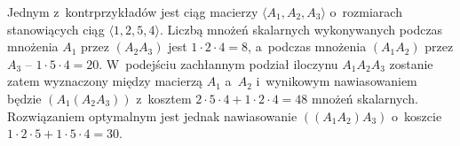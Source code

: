 \exercise %
Jednym z~kontrprzykładów jest ciąg macierzy $\langle A_1,A_2,A_3\rangle$ o~rozmiarach stanowiących ciąg $\langle1,2,5,4\rangle$.
Liczbą mnożeń skalarnych wykonywanych podczas mnożenia $A_1$ przez $(A_2A_3)$ jest $1\cdot2\cdot4=8$, a~podczas mnożenia $(A_1A_2)$ przez $A_3$ -- $1\cdot5\cdot4=20$.
W~podejściu zachłannym podział iloczynu $A_1A_2A_3$ zostanie zatem wyznaczony między macierzą $A_1$ a~$A_2$ i~wynikowym nawiasowaniem będzie $(A_1(A_2A_3))$ z~kosztem $2\cdot5\cdot4+1\cdot2\cdot4=48$ mnożeń skalarnych.
Rozwiązaniem optymalnym jest jednak nawiasowanie $((A_1A_2)A_3)$ o~koszcie $1\cdot2\cdot5+1\cdot5\cdot4=30$.
